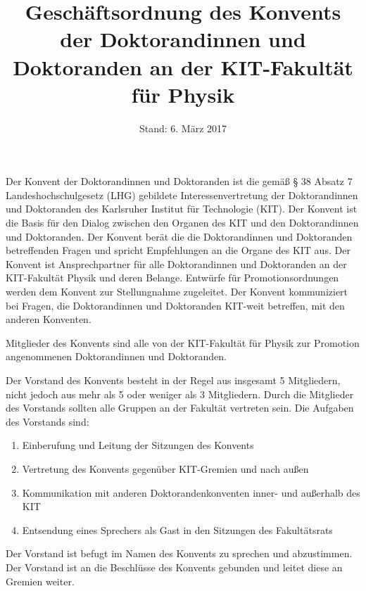 \documentclass[a4paper, parskip=half, numbers=noenddot]{scrartcl}
\title{Geschäftsordnung des Konvents der Doktorandinnen und Doktoranden an der KIT-Fakultät für Physik}
\date{Stand: 6. März 2017}
\begin{document}
\maketitle



\begin{contract}


\tableofcontents


\label{aufgaben}

Der Konvent der Doktorandinnen und Doktoranden ist die gemäß § 38 Absatz 7
Landeshochschulgesetz (LHG) gebildete Interessenvertretung der Doktorandinnen und
Doktoranden des Karlsruher Institut für Technologie (KIT).
Der Konvent ist die Basis für den Dialog zwischen den Organen des KIT und den Doktorandinnen und Doktoranden.
Der Konvent berät die die Doktorandinnen und Doktoranden betreffenden Fragen und spricht Empfehlungen an die Organe des KIT aus.
Der Konvent ist Ansprechpartner für alle Doktorandinnen und Doktoranden an der KIT-Fakultät Physik und deren Belange.
Entwürfe für Promotionsordnungen werden dem Konvent zur Stellungnahme zugeleitet.
Der Konvent kommuniziert bei Fragen, die Doktorandinnen und Doktoranden KIT-weit betreffen, mit den anderen Konventen.


Mitglieder des Konvents sind alle von der KIT-Fakultät für Physik zur Promotion angenommenen Doktorandinnen und Doktoranden. 


Der Vorstand des Konvents besteht in der Regel aus insgesamt 5 Mitgliedern,
nicht jedoch aus mehr als 5 oder weniger als 3 Mitgliedern.
Durch die Mitglieder des Vorstands sollten alle Gruppen an der Fakultät vertreten sein.
Die Aufgaben des Vorstands sind:
\begin{enumerate}
	\item Einberufung und Leitung der Sitzungen des Konvents
	\item Vertretung des Konvents gegenüber KIT-Gremien und nach außen
	\item Kommunikation mit anderen Doktorandenkonventen inner- und außerhalb des KIT
	\item Entsendung eines Sprechers als Gast in den Sitzungen des Fakultätsrats
\end{enumerate}
Der Vorstand ist befugt im Namen des Konvents zu sprechen und abzustimmen.
Der Vorstand ist an die Beschlüsse des Konvents gebunden und leitet diese an Gremien weiter.


\end{contract}
\end{document}
